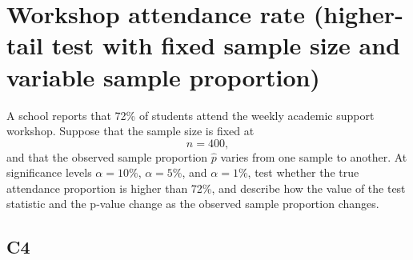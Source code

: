 \section{Workshop attendance rate (higher-tail test with fixed sample size and variable sample proportion)}
A school reports that 72\% of students attend the weekly academic support workshop. Suppose that the sample size is fixed at
\[
n=400,
\]
and that the observed sample proportion \(\hat p\) varies from one sample to another. At significance levels \(\alpha=10\%\), \(\alpha=5\%\), and \(\alpha=1\%\), test whether the true attendance proportion is higher than 72\%, and describe how the value of the test statistic and the p-value change as the observed sample proportion changes.

\subsection*{C4}
